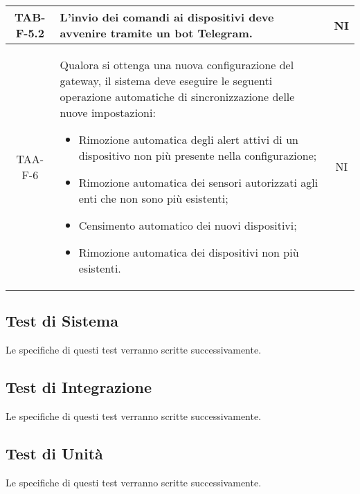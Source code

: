 \begin{center}
\begin{longtable}{|c|p{10cm}|c|}
			  \hline
			  TAB-F-5.2 & L'invio dei comandi ai dispositivi deve avvenire tramite un bot Telegram. & NI \\
			  \hline
			  TAA-F-6 & Qualora si ottenga una nuova configurazione del gateway, il sistema deve eseguire le seguenti operazione automatiche di sincronizzazione delle nuove impostazioni:
			  \begin{itemize}
			  	\item Rimozione automatica degli alert attivi di un dispositivo non più presente nella configurazione;
			  	\item Rimozione automatica dei sensori autorizzati agli enti che non sono più esistenti;
			  	\item Censimento automatico dei nuovi dispositivi;
			  	\item Rimozione automatica dei dispositivi non più esistenti.
			  \end{itemize} & NI \\
			  \hline
			\end{longtable}
		\end{center}

		\subsection{Test di Sistema}
			Le specifiche di questi test verranno scritte successivamente. 

		\subsection{Test di Integrazione}
			Le specifiche di questi test verranno scritte successivamente. 

		\subsection{Test di Unità}
		 	Le specifiche di questi test verranno scritte successivamente. 
